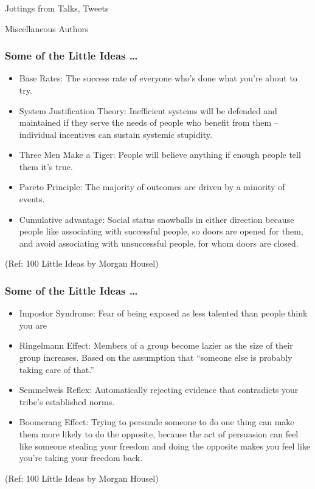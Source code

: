 \begin{frame}[fragile]\frametitle{}
\begin{center}
{\Large Jottings from Talks, Tweets}

{\small Miscellaneous Authors }


\end{center}
\end{frame}

\begin{frame}[fragile]\frametitle{ Some of the Little Ideas \ldots}

	\begin{itemize}
	\item Base Rates: The success rate of everyone who’s done what you’re about to try.
	\item System Justification Theory: Inefficient systems will be defended and maintained if they serve the needs of people who benefit from them – individual incentives can sustain systemic stupidity.
	\item Three Men Make a Tiger: People will believe anything if enough people tell them it’s true.
	\item Pareto Principle: The majority of outcomes are driven by a minority of events.
	\item Cumulative advantage: Social status snowballs in either direction because people like associating with successful people, so doors are opened for them, and avoid associating with unsuccessful people, for whom doors are closed.
	\end{itemize}

{\tiny (Ref: 100 Little Ideas by Morgan Housel)}

\end{frame}

\begin{frame}[fragile]\frametitle{ Some of the Little Ideas \ldots}

	\begin{itemize}
	\item Impostor Syndrome: Fear of being exposed as less talented than people think you are
	\item Ringelmann Effect: Members of a group become lazier as the size of their group increases. Based on the assumption that “someone else is probably taking care of that.”
	\item Semmelweis Reflex: Automatically rejecting evidence that contradicts your tribe’s established norms. 
	\item Boomerang Effect: Trying to persuade someone to do one thing can make them more likely to do the opposite, because the act of persuasion can feel like someone stealing your freedom and doing the opposite makes you feel like you’re taking your freedom back.
	\end{itemize}

{\tiny (Ref: 100 Little Ideas by Morgan Housel)}

\end{frame}


